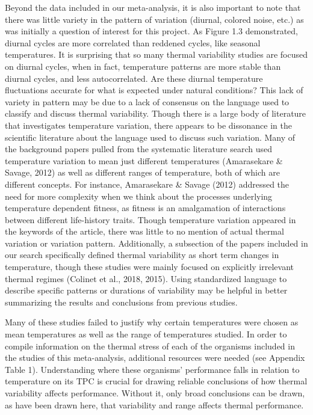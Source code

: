 \documentclass[12pt,twoside]{reedthesis}
\begin{document}
Beyond the data included in our meta-analysis, it is also important to note that there was little variety in the pattern of variation (diurnal, colored noise, etc.) as was initially a question of interest for this project. As Figure 1.3 demonstrated, diurnal cycles are more correlated than reddened cycles, like seasonal temperatures. It is surprising that so many thermal variability studies are focused on diurnal cycles, when in fact, temperature patterns are more stable than diurnal cycles, and less autocorrelated. Are these diurnal temperature fluctuations accurate for what is expected under natural conditions? This lack of variety in pattern may be due to a lack of consensus on the language used to classify and discuss thermal variability. Though there is a large body of literature that investigates temperature variation, there appears to be dissonance in the scientific literature about the language used to discuss such variation. Many of the background papers pulled from the systematic literature search used temperature variation to mean just different temperatures (Amarasekare \& Savage, 2012) as well as different ranges of temperature, both of which are different concepts. For instance, Amarasekare \& Savage (2012) addressed the need for more complexity when we think about the processes underlying temperature dependent fitness, as fitness is an amalgamation of interactions between different life-history traits. Though temperature variation appeared in the keywords of the article, there was little to no mention of actual thermal variation or variation pattern. Additionally, a subsection of the papers included in our search specifically defined thermal variability as short term changes in temperature, though these studies were mainly focused on explicitly irrelevant thermal regimes (Colinet et al., 2018, 2015). Using standardized language to describe specific patterns or durations of variability may be helpful in better summarizing the results and conclusions from previous studies.

Many of these studies failed to justify why certain temperatures were chosen as mean temperatures as well as the range of temperatures studied. In order to compile information on the thermal stress of each of the organisms included in the studies of this meta-analysis, additional resources were needed (see Appendix Table 1). Understanding where these organisms' performance falls in relation to temperature on its TPC is crucial for drawing reliable conclusions of how thermal variability affects performance. Without it, only broad conclusions can be drawn, as have been drawn here, that variability and range affects thermal performance.
\end{document}

